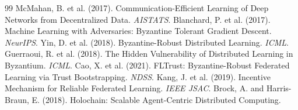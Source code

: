\documentclass[11pt,twocolumn]{article}
\begin{document}
\begin{thebibliography}{99}
   McMahan, B. et al. (2017). Communication-Efficient
    Learning of Deep Networks from Decentralized Data. \textit{AISTATS}.
   Blanchard, P. et al. (2017). Machine Learning with
    Adversaries: Byzantine Tolerant Gradient Descent. \textit{NeurIPS}.
   Yin, D. et al. (2018). Byzantine-Robust Distributed
    Learning. \textit{ICML}.
   Guerraoui, R. et al. (2018). The Hidden Vulnerability
    of Distributed Learning in Byzantium. \textit{ICML}.
   Cao, X. et al. (2021). FLTrust: Byzantine-Robust Federated
    Learning via Trust Bootstrapping. \textit{NDSS}.
   Kang, J. et al. (2019). Incentive Mechanism for Reliable
    Federated Learning. \textit{IEEE JSAC}.
   Brock, A. and Harris-Braun, E. (2018). Holochain:
    Scalable Agent-Centric Distributed Computing.
\end{thebibliography}
\end{document}
